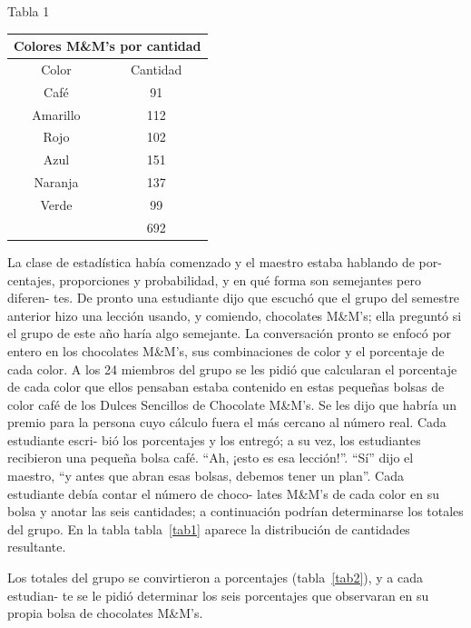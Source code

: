 \documentclass[10pt,twoside]{article}
\begin{document}
\begin{minipage}{0.35\textwidth}
\begin{center}
Tabla 1
\end{center}
\begin{tabular}{c|c}\label{tab1}
\multicolumn{2}{c}{Colores M\&M's por cantidad} \\ \hline
Color & Cantidad \\ \hline
Café & 91 \\ 
Amarillo & 112 \\ 
Rojo & 102 \\ 
Azul & 151 \\ 
Naranja & 137 \\ 
Verde & 99 \\ \cline{2-2}
 & 692 \\ 
\hline 
\end{tabular}
\end{minipage}\hfill
\begin{minipage}{.6\textwidth}
La clase de estadística había comenzado y el maestro estaba hablando de por-
centajes, proporciones y probabilidad, y en qué forma son semejantes pero diferen-
tes. De pronto una estudiante dijo que escuchó que el grupo del semestre anterior
hizo una lección usando, y comiendo, chocolates M\&M’s; ella preguntó si el grupo
de este año haría algo semejante. La conversación pronto se enfocó por entero en
los chocolates M\&M’s, sus combinaciones de color y el porcentaje de cada color. A
los 24 miembros del grupo se les pidió que calcularan el porcentaje de cada color
que ellos pensaban estaba contenido en estas pequeñas bolsas de color café de los
Dulces Sencillos de Chocolate M\&M’s. Se les dijo que habría un premio para la
persona cuyo cálculo fuera el más cercano al número real. Cada estudiante escri-
bió los porcentajes y los entregó; a su vez, los estudiantes recibieron una pequeña
bolsa café. “Ah, ¡esto es esa lección!”. “Sí” dijo el maestro, “y antes que abran esas
bolsas, debemos tener un plan”. Cada estudiante debía contar el número de choco-
lates M\&M's de cada color en su bolsa y anotar las seis cantidades; a continuación
podrían determinarse los totales del grupo. En la tabla tabla~\ref{tab1} aparece la distribución
de cantidades resultante.
\end{minipage} 

Los totales del grupo se convirtieron a porcentajes (tabla~\ref{tab2}), y a cada estudian-
te se le pidió determinar los seis porcentajes que observaran en su propia bolsa de
chocolates M\&M's.
\end{document}
